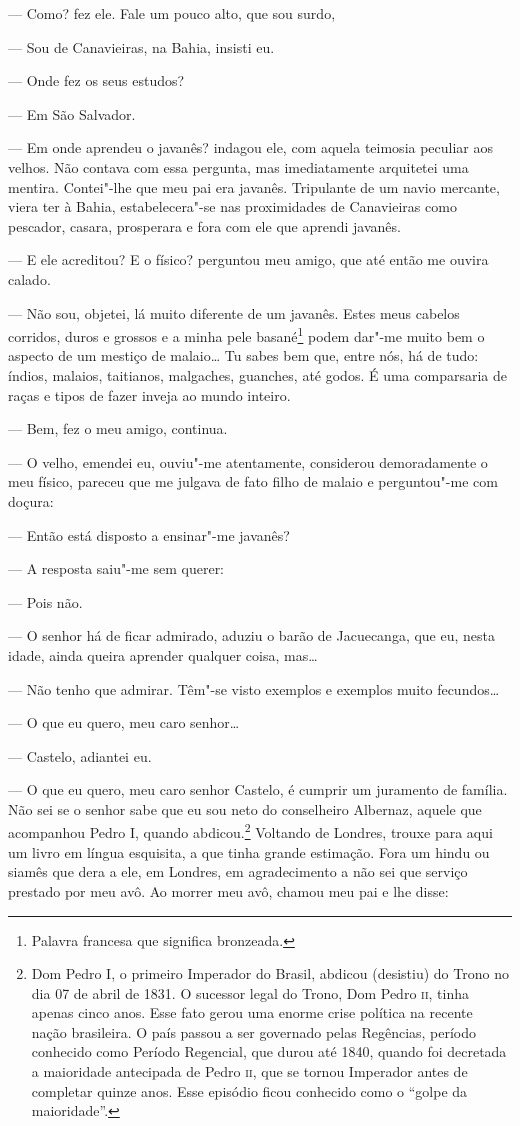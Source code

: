 --- Como? fez ele. Fale um pouco alto, que sou surdo,

--- Sou de Canavieiras, na Bahia, insisti eu.

--- Onde fez os seus estudos?

--- Em São Salvador.

--- Em onde aprendeu o javanês? indagou ele, com aquela teimosia
peculiar aos velhos. Não contava com essa pergunta, mas imediatamente
arquitetei uma mentira. Contei"-lhe que meu pai era javanês. Tripulante
de um navio mercante, viera ter à Bahia, estabelecera"-se nas
proximidades de Canavieiras como pescador, casara, prosperara e fora com
ele que aprendi javanês.

--- E ele acreditou? E o físico?
perguntou meu amigo, que até então me ouvira calado.

--- Não sou, objetei, lá muito diferente de um javanês. Estes meus
cabelos corridos, duros e grossos e a minha pele basané\footnote{Palavra
  francesa que significa bronzeada.} podem dar"-me muito bem o aspecto de
um mestiço de malaio\ldots{} Tu sabes bem que, entre nós, há de tudo: índios,
malaios, taitianos, malgaches, guanches, até godos. É uma comparsaria de
raças e tipos de fazer inveja ao mundo inteiro.

--- Bem, fez o meu amigo, continua.

--- O velho, emendei eu, ouviu"-me atentamente, considerou demoradamente
o meu físico, pareceu que me julgava de fato filho de malaio e
perguntou"-me com doçura:

--- Então está disposto a ensinar"-me javanês?

--- A resposta saiu"-me sem querer:

--- Pois não.

--- O senhor há de ficar admirado, aduziu o barão de Jacuecanga, que eu,
nesta idade, ainda queira aprender qualquer coisa, mas\ldots{}

--- Não tenho que admirar. Têm"-se visto exemplos e exemplos muito
fecundos\ldots{}

--- O que eu quero, meu caro senhor\ldots{}

--- Castelo, adiantei eu.

--- O que eu quero, meu caro senhor Castelo, é cumprir um juramento de
família. Não sei se o senhor sabe que eu sou neto do conselheiro
Albernaz, aquele que acompanhou Pedro I, quando abdicou.\footnote{Dom
  Pedro I, o primeiro Imperador do Brasil, abdicou (desistiu) do Trono
  no dia 07 de abril de 1831. O sucessor legal do Trono, Dom Pedro \textsc{ii},
  tinha apenas cinco anos. Esse fato gerou uma enorme crise política na
  recente nação brasileira. O país passou a ser governado pelas
  Regências, período conhecido como Período Regencial, que durou até
  1840, quando foi decretada a maioridade antecipada de Pedro \textsc{ii}, que se
  tornou Imperador antes de completar quinze anos. Esse episódio ficou
  conhecido como o ``golpe da maioridade''.} Voltando de Londres, trouxe
para aqui um livro em língua esquisita, a que tinha grande estimação.
Fora um hindu ou siamês que dera a ele, em Londres, em agradecimento a
não sei que serviço prestado por meu avô. Ao morrer meu avô, chamou meu
pai e lhe disse:

